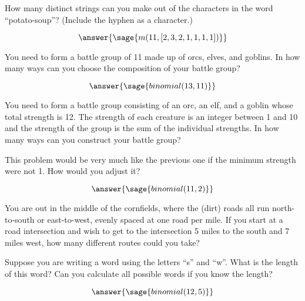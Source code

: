 \documentclass{ximera}
\begin{document}
\begin{problem} 

How many distinct strings can you make out of the characters
in the word ``potato-soup''?   (Include the hyphen as a character.)
\begin{explanation}
$$\answer{\sage{m(11,[2,3,2,1,1,1,1])} }$$
\end{explanation}

\end{problem}



\begin{problem} 
You need to form a battle group of 11 made up of orcs, elves, and
goblins.   In how many ways can you choose the composition of your battle group?
\begin{explanation}
$$\answer{\sage{binomial(13,11)}}$$
\end{explanation}
\end{problem}



\begin{problem} 
You need to form a battle group consisting of an orc, an elf, and
a goblin whose total strength is 12.   
The strength of each creature is 
an integer between 1 and 10 and the strength of the group is the sum of the
individual strengths.  In how many ways can you construct your battle group?
\begin{hint}
    This problem would be very much like the previous one if the minimum strength were not 1. How would you adjust it?
\end{hint}
\begin{explanation}
$$\answer{\sage{binomial(11,2)} }$$
\end{explanation}

\end{problem}



\begin{problem} 
You are out in the middle of the cornfields, where the (dirt) roads
all run north-to-south or east-to-west, evenly spaced at one road per mile.   
If you start
at a road intersection and wish to get to the intersection 5 miles to the
south and 7 miles west, how many different routes could you take?
\begin{hint}
Suppose you are writing a word using the letters ``s'' and ``w''. What is the length of this word? Can you calculate all possible words if you know the length?
\end{hint}
\begin{explanation}
$$\answer{\sage{binomial(12,5)} }$$
\end{explanation}

\end{problem}
\end{document}
